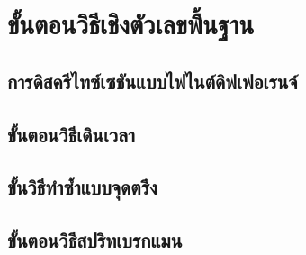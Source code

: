 \section{ขั้นตอนวิธีเชิงตัวเลขพื้นฐาน}
\subsection{การดิสครีไทซ์เซชันแบบไฟไนต์ดิฟเฟอเรนจ์}
\subsection{ขั้นตอนวิธีเดินเวลา}
\subsection{ขั้นวิธีทำซ้ำแบบจุดตรึง}
\subsection{ขั้นตอนวิธีสปริทเบรกแมน}